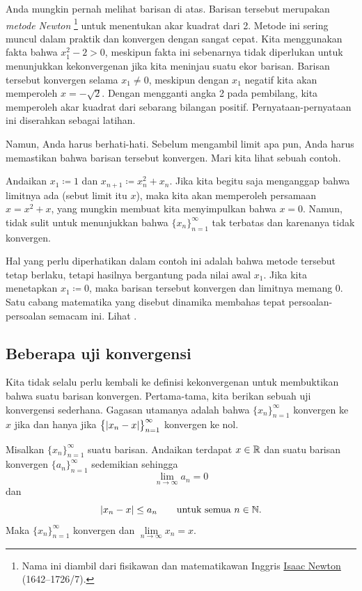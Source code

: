 Anda mungkin pernah melihat barisan di atas.  Barisan tersebut merupakan
\emph{metode Newton}%
\footnote{%
Nama ini diambil dari fisikawan dan matematikawan Inggris
\href{https://en.wikipedia.org/wiki/Isaac_Newton}{Isaac Newton}
(1642--1726/7).}
untuk menentukan akar kuadrat dari 2.  Metode ini sering muncul dalam
praktik dan konvergen dengan sangat cepat.  Kita menggunakan fakta bahwa
$x_1^2 -2 >0$, meskipun fakta ini sebenarnya tidak diperlukan untuk menunjukkan kekonvergenan jika kita
meninjau suatu ekor barisan.
Barisan tersebut konvergen selama $x_1 \neq 0$, meskipun dengan $x_1$ negatif
kita akan memperoleh $x=-\sqrt{2}$.  Dengan mengganti angka 2 pada pembilang, kita
memperoleh akar kuadrat dari sebarang bilangan positif.  Pernyataan-pernyataan ini diserahkan sebagai
latihan.

Namun, Anda harus berhati-hati.  Sebelum mengambil limit apa pun, Anda harus
memastikan bahwa barisan tersebut konvergen.  Mari kita lihat sebuah contoh.

\begin{example}
Andaikan $x_1 \coloneqq 1$ dan $x_{n+1} \coloneqq x_n^2+x_n$.
Jika kita begitu saja menganggap bahwa limitnya ada (sebut limit itu $x$), maka kita
akan memperoleh persamaan $x = x^2+x$, yang mungkin membuat kita
menyimpulkan bahwa $x=0$.  Namun, tidak sulit
untuk menunjukkan bahwa $\{ x_n \}_{n=1}^\infty$ tak terbatas dan karenanya tidak konvergen.

Hal yang perlu diperhatikan dalam contoh ini adalah bahwa metode tersebut tetap berlaku, tetapi
hasilnya bergantung pada nilai awal $x_1$.  Jika kita menetapkan $x_1 \coloneqq 0$,
maka barisan tersebut konvergen dan limitnya memang 0.
Satu cabang matematika yang disebut dinamika membahas tepat persoalan-persoalan
semacam ini.
Lihat
.
\end{example}

\subsection{Beberapa uji konvergensi}

Kita tidak selalu perlu kembali ke definisi kekonvergenan
untuk membuktikan bahwa suatu barisan konvergen.  Pertama-tama, kita berikan sebuah uji konvergensi sederhana.
Gagasan utamanya adalah bahwa
$\{ x_n \}_{n=1}^\infty$ konvergen ke $x$ jika dan hanya jika
$\bigl\{ \lvert { x_n - x } \rvert \bigr\}_{n=1}^\infty$ konvergen ke nol.

\begin{prop} \label{convzero:prop}
Misalkan $\{ x_n \}_{n=1}^\infty$ suatu barisan.
Andaikan terdapat $x \in {\mathbb{R}}$
dan suatu barisan konvergen $\{ a_n \}_{n=1}^\infty$
sedemikian sehingga
\begin{equation*}
\lim_{n\to\infty} a_n = 0
\end{equation*}
dan
\begin{equation*}
\lvert {x_n - x} \rvert \leq a_n
\qquad
\text{untuk semua $n \in {\mathbb{N}}$.}
\end{equation*}
Maka $\{ x_n \}_{n=1}^\infty$ konvergen dan $\lim\limits_{n\to\infty} x_n = x$.
\end{prop}

